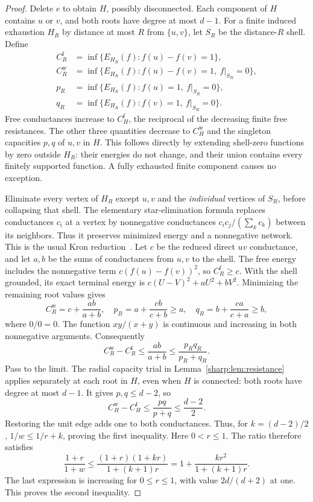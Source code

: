 \begin{proof}
Delete $e$ to obtain $H$, possibly disconnected. Each component of $H$
contains $u$ or $v$, and both roots have degree at most $d-1$.
For a finite induced exhaustion $H_R$ by distance at most $R$ from
$\{u,v\}$, let $S_R$ be the distance-$R$ shell. Define
\begin{align*}
 C_R^{\mathrm f}&=\inf\{E_{H_R}(f):f(u)-f(v)=1\},\\
 C_R^{\mathrm w}&=\inf\{E_{H_R}(f):f(u)-f(v)=1,\ f|_{S_R}=0\},\\
 p_R&=\inf\{E_{H_R}(f):f(u)=1,\ f|_{S_R}=0\},\\
 q_R&=\inf\{E_{H_R}(f):f(v)=1,\ f|_{S_R}=0\}.
\end{align*}
Free conductances increase to $C_H^{\mathrm f}$, the reciprocal of
the decreasing finite free resistances. The other three quantities
decrease to $C_H^{\mathrm w}$ and the singleton capacities $p,q$ of
$u,v$ in $H$. This follows directly by extending shell-zero functions
by zero outside $H_R$: their energies do not change, and their union
contains every finitely supported function. A fully exhausted finite
component causes no exception.

Eliminate every vertex of $H_R$ except $u,v$ and the \emph{individual}
vertices of $S_R$, before collapsing that shell. The elementary
star-elimination formula replaces conductances $c_i$ at a vertex by
nonnegative conductances $c_ic_j/(\sum_kc_k)$ between its neighbors.
Thus it preserves minimized energy and a nonnegative network.
This is the usual Kron reduction~\cite{DorflerBullo}.
Let $c$ be the reduced direct $uv$ conductance, and let $a,b$ be the
sums of conductances from $u,v$ to the shell. The free energy includes
the nonnegative term $c(f(u)-f(v))^2$, so $C_R^{\mathrm f}\ge c$.
With the shell grounded, its exact terminal energy is
$c(U-V)^2+aU^2+bV^2$. Minimizing the remaining root values gives
\[
 C_R^{\mathrm w}=c+\frac{ab}{a+b},\quad
 p_R=a+\frac{cb}{c+b}\ge a,\quad
 q_R=b+\frac{ca}{c+a}\ge b,
\]
where $0/0=0$. The function $xy/(x+y)$ is continuous and increasing
in both nonnegative arguments. Consequently
\[
 C_R^{\mathrm w}-C_R^{\mathrm f}
       \le\frac{ab}{a+b}\le\frac{p_Rq_R}{p_R+q_R}.
\]
Pass to the limit. The radial capacity trial in
Lemma~\ref{sharp:lem:resistance} applies separately at each root in $H$,
even when $H$ is connected: both roots have degree at most $d-1$.
It gives $p,q\le d-2$, so
\begin{equation}\label{sharp:eq:escape-conductance}
 C_H^{\mathrm w}-C_H^{\mathrm f}
             \le\frac{pq}{p+q}\le\frac{d-2}{2}.
\end{equation}
Restoring the unit edge adds one to both conductances. Thus, for
$k=(d-2)/2$, $1/w\le1/r+k$, proving the first inequality.
Here $0<r\le1$. The ratio therefore satisfies
\[
 \frac{1+r}{1+w}\le
 \frac{(1+r)(1+kr)}{1+(k+1)r}
     =1+\frac{kr^2}{1+(k+1)r}.
\]
The last expression is increasing for $0\le r\le1$, with value
$2d/(d+2)$ at one. This proves the second inequality.
\end{proof}

